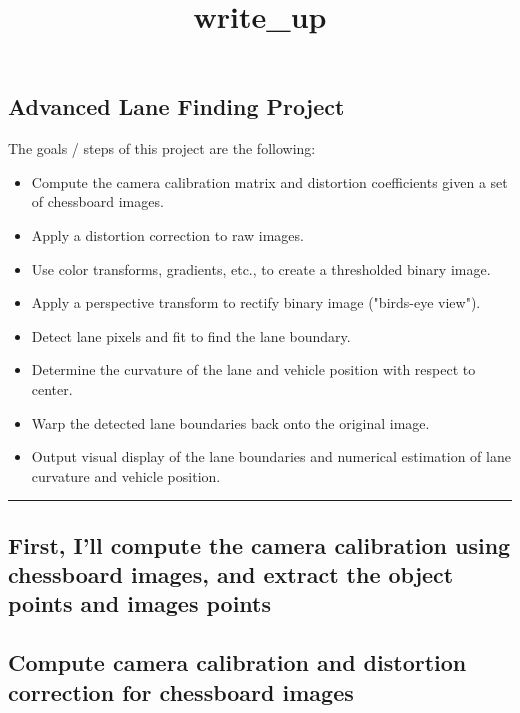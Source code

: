\documentclass[11pt]{article}
\title{write\_up}
\providecommand{\tightlist}{%
      \setlength{\itemsep}{0pt}\setlength{\parskip}{0pt}}
\begin{document}
    
    
    \maketitle
    
    

    
    \subsection{Advanced Lane Finding
Project}\label{advanced-lane-finding-project}

The goals / steps of this project are the following:

\begin{itemize}
\tightlist
\item
  Compute the camera calibration matrix and distortion coefficients
  given a set of chessboard images.
\item
  Apply a distortion correction to raw images.
\item
  Use color transforms, gradients, etc., to create a thresholded binary
  image.
\item
  Apply a perspective transform to rectify binary image ("birds-eye
  view").
\item
  Detect lane pixels and fit to find the lane boundary.
\item
  Determine the curvature of the lane and vehicle position with respect
  to center.
\item
  Warp the detected lane boundaries back onto the original image.
\item
  Output visual display of the lane boundaries and numerical estimation
  of lane curvature and vehicle position.
\end{itemize}

\begin{center}\rule{0.5\linewidth}{\linethickness}\end{center}

\subsection{First, I'll compute the camera calibration using chessboard
images, and extract the object points and images
points}\label{first-ill-compute-the-camera-calibration-using-chessboard-images-and-extract-the-object-points-and-images-points}

    \subsection{Compute camera calibration and distortion correction for
chessboard
images}\label{compute-camera-calibration-and-distortion-correction-for-chessboard-images}
\end{document}
